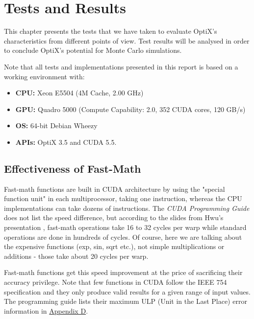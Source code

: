 
\chapter{Tests and Results} %

\label{Chapter5} %

This chapter presents the tests that we have taken to evaluate OptiX's characteristics from different points of view. Test results will be analysed in order to conclude OptiX's potential for Monte Carlo simulations. 

Note that all tests and implementations presented in this report is based on a working environment with:
\begin{itemize}
  \item \textbf{CPU:} Xeon E5504 (4M Cache, 2.00 GHz)
  \item \textbf{GPU:} Quadro 5000 (Compute Capability: 2.0, 352 CUDA cores, 120 GB/s)
  \item \textbf{OS:} 64-bit Debian Wheezy 
  \item \textbf{APIs:} OptiX 3.5 and CUDA 5.5. 
\end{itemize}

\section{Effectiveness of Fast-Math}
Fast-math functions are built in CUDA architecture by using the "special function unit" in each multiprocessor, taking one instruction, whereas the CPU implementations can take dozens of instructions. The \textit{CUDA Programming Guide} does not list the speed difference, but according to the slides from Hwu's presentation \citep{hwu2009programming}, fast-math operations take 16 to 32 cycles per warp while standard operations are done in hundreds of cycles. Of course, here we are talking about the expensive functions (exp, sin, sqrt etc.), not simple multiplications or additions - those take about 20 cycles per warp. 

Fast-math functions get this speed improvement at the price of sacrificing their accuracy privilege. Note that few functions in CUDA follow the IEEE 754 specification \citep{cudaguide} and they only produce valid results for a given range of input values. The programming guide lists their maximum ULP (Unit in the Last Place) error information in \href{http://docs.nvidia.com/cuda/cuda-c-programming-guide/index.html#mathematical-functions-appendix}{Appendix D}. 
 
